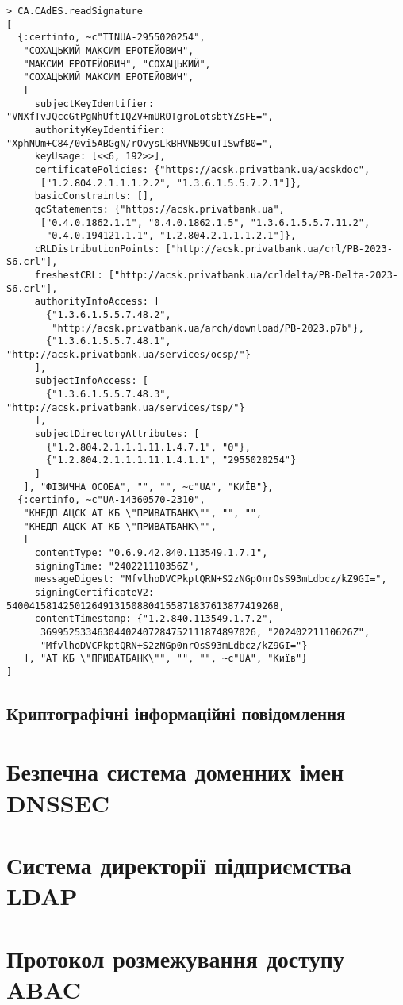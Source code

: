 \begin{lstlisting}[utf8]
> CA.CAdES.readSignature
[
  {:certinfo, ~c"TINUA-2955020254",
   "СОХАЦЬКИЙ МАКСИМ ЕРОТЕЙОВИЧ",
   "МАКСИМ ЕРОТЕЙОВИЧ", "СОХАЦЬКИЙ",
   "СОХАЦЬКИЙ МАКСИМ ЕРОТЕЙОВИЧ",
   [
     subjectKeyIdentifier: "VNXfTvJQccGtPgNhUftIQZV+mUROTgroLotsbtYZsFE=",
     authorityKeyIdentifier: "XphNUm+C84/0vi5ABGgN/rOvysLkBHVNB9CuTISwfB0=",
     keyUsage: [<<6, 192>>],
     certificatePolicies: {"https://acsk.privatbank.ua/acskdoc",
      ["1.2.804.2.1.1.1.2.2", "1.3.6.1.5.5.7.2.1"]},
     basicConstraints: [],
     qcStatements: {"https://acsk.privatbank.ua",
      ["0.4.0.1862.1.1", "0.4.0.1862.1.5", "1.3.6.1.5.5.7.11.2",
       "0.4.0.194121.1.1", "1.2.804.2.1.1.1.2.1"]},
     cRLDistributionPoints: ["http://acsk.privatbank.ua/crl/PB-2023-S6.crl"],
     freshestCRL: ["http://acsk.privatbank.ua/crldelta/PB-Delta-2023-S6.crl"],
     authorityInfoAccess: [
       {"1.3.6.1.5.5.7.48.2",
        "http://acsk.privatbank.ua/arch/download/PB-2023.p7b"},
       {"1.3.6.1.5.5.7.48.1", "http://acsk.privatbank.ua/services/ocsp/"}
     ],
     subjectInfoAccess: [
       {"1.3.6.1.5.5.7.48.3", "http://acsk.privatbank.ua/services/tsp/"}
     ],
     subjectDirectoryAttributes: [
       {"1.2.804.2.1.1.1.11.1.4.7.1", "0"},
       {"1.2.804.2.1.1.1.11.1.4.1.1", "2955020254"}
     ]
   ], "ФІЗИЧНА ОСОБА", "", "", ~c"UA", "КИЇВ"},
  {:certinfo, ~c"UA-14360570-2310",
   "КНЕДП АЦСК АТ КБ \"ПРИВАТБАНК\"", "", "",
   "КНЕДП АЦСК АТ КБ \"ПРИВАТБАНК\"",
   [
     contentType: "0.6.9.42.840.113549.1.7.1",
     signingTime: "240221110356Z",
     messageDigest: "MfvlhoDVCPkptQRN+S2zNGp0nrOsS93mLdbcz/kZ9GI=",
     signingCertificateV2: 540041581425012649131508804155871837613877419268,
     contentTimestamp: {"1.2.840.113549.1.7.2",
      36995253346304402407284752111874897026, "20240221110626Z",
      "MfvlhoDVCPkptQRN+S2zNGp0nrOsS93mLdbcz/kZ9GI="}
   ], "АТ КБ \"ПРИВАТБАНК\"", "", "", ~c"UA", "Київ"}
]
\end{lstlisting}
\renewcommand{\footnotesize}{\normal}

\subsection{Криптографічні інформаційні повідомлення}

\section{Безпечна система доменних імен DNSSEC}

\section{Система директорії підприємства LDAP}

\section{Протокол розмежування доступу ABAC}

